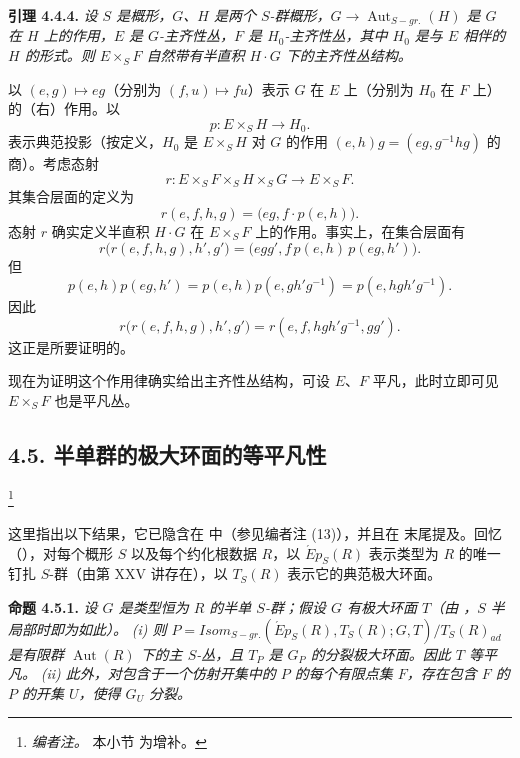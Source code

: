 \textbf{引理 4.4.4.} \emph{设 \(S\) 是概形，\(G\)、\(H\) 是两个 \(S\)-群概形，\(G \to \operatorname{Aut}_{S-gr.}(H)\) 是 \(G\) 在 \(H\) 上的作用，\(E\) 是 \(G\)-主齐性丛，\(F\) 是 \(H_0\)-主齐性丛，其中 \(H_0\) 是与 \(E\) 相伴的 \(H\) 的形式。则 \(E \times_{S} F\) 自然带有半直积 \(H \cdot G\) 下的主齐性丛结构。}

以 \((e, g) \mapsto eg\)（分别为 \((f, u) \mapsto f u\)）表示 \(G\) 在 \(E\) 上（分别为 \(H_0\) 在 \(F\) 上）的（右）作用。以
\[
  p:E\times_S H\longrightarrow H_0.
\]
表示典范投影（按定义，\(H_0\) 是 \(E \times_{S} H\) 对 \(G\) 的作用 \((e, h) g = (eg, g^{-1} h g)\) 的商）。考虑态射
\[
  r:E\times_S F\times_S H\times_S G\longrightarrow E\times_S F.
\]
其集合层面的定义为
\[
  r(e,f,h,g)=\bigl(eg,f\cdot p(e,h)\bigr).
\]
态射 \(r\) 确实定义半直积 \(H \cdot G\) 在 \(E \times_{S} F\) 上的作用。事实上，在集合层面有
\[
  r\bigl(r(e,f,h,g),h',g'\bigr)
  =\bigl(egg',f\,p(e,h)\,p(eg,h')\bigr).
\]
但
\[
  p(e,h)p(eg,h')
  =p(e,h)p(e,gh'g^{-1})
  =p(e,hgh'g^{-1}).
\]
因此
\[
  r\bigl(r(e,f,h,g),h',g'\bigr)
  =r(e,f,hgh'g^{-1},gg').
\]
这正是所要证明的。

现在为证明这个作用律确实给出主齐性丛结构，可设 \(E\)、\(F\) 平凡，此时立即可见 \(E \times_{S} F\) 也是平凡丛。

\subsection*{4.5. 半单群的极大环面的等平凡性}
\footnote{\textit{编者注。} 本小节  为增补。}

这里指出以下结果，它已隐含在  中（参见编者注 (13)），并且在 末尾提及。回忆（），对每个概形 \(S\) 以及每个约化根数据 \(R\)，以 \(\acute{E}p_{S}(R)\) 表示类型为 \(R\) 的唯一钉扎 \(S\)-群（由第 XXV 讲存在），以 \(T_{S}(R)\) 表示它的典范极大环面。

\textbf{命题 4.5.1.} \emph{设 \(G\) 是类型恒为 \(R\) 的半单 \(S\)-群；假设 \(G\) 有极大环面 \(T\)（由 ，\(S\) 半局部时即为如此）。}
\emph{(i) 则 \(P = Isom_{S-gr.}(\acute{E}p_{S}(R), T_{S}(R); G, T) / T_{S}(R)_{ad}\) 是有限群 \(\operatorname{Aut}(R)\) 下的主 \(S\)-丛，且 \(T_P\) 是 \(G_P\) 的分裂极大环面。因此 \(T\) 等平凡。}
\emph{(ii) 此外，对包含于一个仿射开集中的 \(P\) 的每个有限点集 \(F\)，存在包含 \(F\) 的 \(P\) 的开集 \(U\)，使得 \(G_U\) 分裂。}

